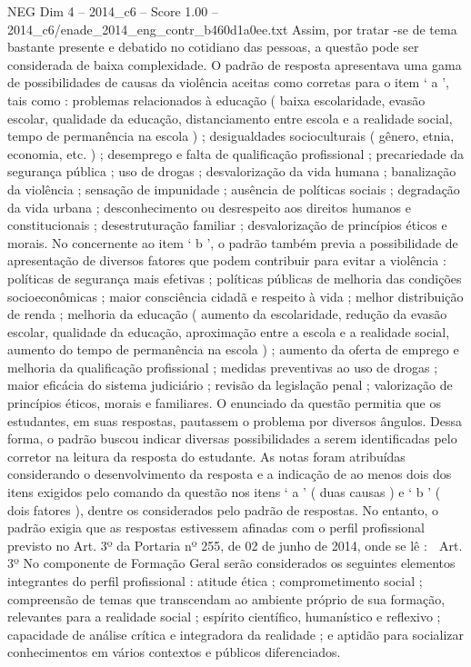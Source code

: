 \begin{textsample}{NEG Dim 4 – 2014\_c6 – Score 1.00 – 2014\_c6/enade\_2014\_eng\_contr\_b460d1a0ee.txt}
Assim, por tratar -se de tema bastante presente e debatido no cotidiano das pessoas, a questão pode ser considerada de baixa complexidade.
O padrão de resposta apresentava uma gama de possibilidades de causas da violência aceitas como corretas para o item ‘ a ’, tais como : problemas relacionados à educação ( baixa escolaridade, evasão escolar, qualidade da educação, distanciamento entre escola e a realidade social, tempo de permanência na escola ) ; desigualdades socioculturais ( gênero, etnia, economia, etc. ) ; desemprego e falta de qualificação profissional ; precariedade da segurança pública ; uso de drogas ; desvalorização da vida humana ; banalização da violência ; sensação de impunidade ; ausência de políticas sociais ; degradação da vida urbana ; desconhecimento ou desrespeito aos direitos humanos e constitucionais ; desestruturação familiar ; desvalorização de princípios éticos e morais.
No concernente ao item ‘ b ’, o padrão também previa a possibilidade de apresentação de diversos fatores que podem contribuir para evitar a violência : políticas de segurança mais efetivas ; políticas públicas de melhoria das condições socioeconômicas ; maior consciência cidadã e respeito à vida ; melhor distribuição de renda ; melhoria da educação ( aumento da escolaridade, redução da evasão escolar, qualidade da educação, aproximação entre a escola e a realidade social, aumento do tempo de permanência na escola ) ; aumento da oferta de emprego e melhoria da qualificação profissional ; medidas preventivas ao uso de drogas ; maior eficácia do sistema judiciário ; revisão da legislação penal ; valorização de princípios éticos, morais e familiares.
O enunciado da questão permitia que os estudantes, em suas respostas, pautassem o problema por diversos ângulos.
Dessa forma, o padrão buscou indicar diversas possibilidades a serem identificadas pelo corretor na leitura da resposta do estudante.
As notas foram atribuídas considerando o desenvolvimento da resposta e a indicação de ao menos dois dos itens exigidos pelo comando da questão nos itens ‘ a ’ ( duas causas ) e ‘ b ’ ( dois fatores ), dentre os considerados pelo padrão de respostas.
No entanto, o padrão exigia que as respostas estivessem afinadas com o perfil profissional previsto no Art. 3º da Portaria nº 255, de 02 de junho de 2014, onde se lê :  Art. 3º No componente de Formação Geral serão considerados os seguintes elementos integrantes do perfil profissional : atitude ética ; comprometimento social ; compreensão de temas que transcendam ao ambiente próprio de sua formação, relevantes para a realidade social ; espírito científico, humanístico e reflexivo ; capacidade de análise crítica e integradora da realidade ; e aptidão para socializar conhecimentos em vários contextos e públicos diferenciados.

\end{textsample}
